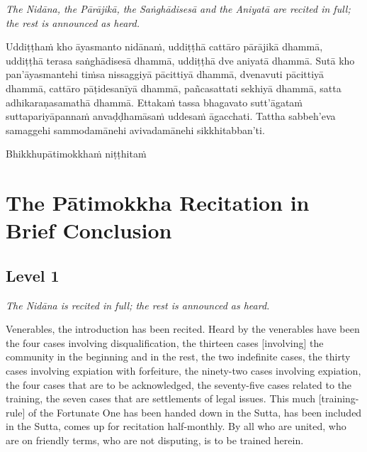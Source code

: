 \textit{The Nidāna, the Pārājikā, the Saṅghādisesā and the Aniyatā are recited in full; the rest is announced as heard.}

\smallskip

Uddiṭṭhaṁ kho āyasmanto nidānaṁ, uddiṭṭhā cattāro pārājikā dhammā, uddiṭṭhā terasa saṅghādisesā dhammā, uddiṭṭhā dve aniyatā dhammā. Sutā kho pan'āyasmantehi tiṁsa nissaggiyā pācittiyā dhammā, dvenavuti pācittiyā dhammā, cattāro pāṭidesanīyā dhammā, pañcasattati sekhiyā dhammā, satta adhikaraṇasamathā dhammā. Ettakaṁ tassa bhagavato sutt'āgataṁ suttapariyāpannaṁ anvaḍḍhamāsaṁ uddesaṁ āgacchati. Tattha sabbeh'eva samaggehi sammodamānehi avivadamānehi sikkhitabban'ti.

\begin{outro}
	Bhikkhupātimokkhaṁ niṭṭhitaṁ
\end{outro}

\clearpage



\section{The Pātimokkha Recitation in Brief Conclusion}
\label{patimokkha-in-brief-conclusion}

\ifafiveversion\vspace{0.15cm}\fi
\ifninebythirteenversion\vspace{0.15cm}\fi

{}
\subsection*{Level 1}
\label{in-brief-english-level1}

\textit{The Nidāna is recited in full; the rest is announced as heard.}

\smallskip

Venerables, the introduction has been recited. Heard by the venerables have been the four cases involving disqualification, the thirteen cases [involving] the community in the beginning and in the rest, the two indefinite cases, the thirty cases involving expiation with forfeiture, the ninety-two cases involving expiation, the four cases that are to be acknowledged, the seventy-five cases related to the training, the seven cases that are settlements of legal issues. This much [training-rule] of the Fortunate One has been handed down in the Sutta, has been included in the Sutta, comes up for recitation half-monthly. By all who are united, who are on friendly terms, who are not disputing, is to be trained herein.

